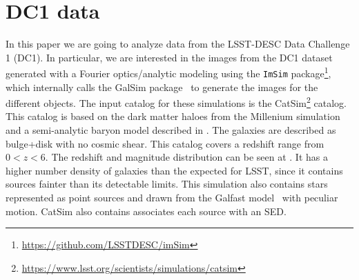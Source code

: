\documentclass[\docopts]{\docclass}
\begin{document}
\section{DC1 data}
\label{sec:data}
In this paper we are going to analyze data from the LSST-DESC Data Challenge 1 (DC1). In particular, we are interested in the images from the DC1 dataset generated with a Fourier optics/analytic modeling using the \texttt{ImSim} package\footnote{\url{https://github.com/LSSTDESC/imSim}}, which internally calls the GalSim package~\citep{2015A&C....10..121R}  to generate the images for the different objects. The input catalog for these simulations is the CatSim\footnote{\url{https://www.lsst.org/scientists/simulations/catsim}} catalog. This catalog is based on the dark matter haloes from the Millenium simulation and a semi-analytic baryon model described in \citep{2006MNRAS.366..499D}. The galaxies are described as bulge+disk with no cosmic shear. This catalog covers a redshift range from $0 < z < 6$. The redshift and magnitude distribution can be seen at . It has a higher number density of galaxies than the expected for LSST, since it contains sources fainter than its detectable limits. This simulation also contains stars represented as point sources and drawn from the Galfast model~\citep{2008ApJ...673..864J} with peculiar motion. CatSim also contains associates each source with an SED.
\end{document}
